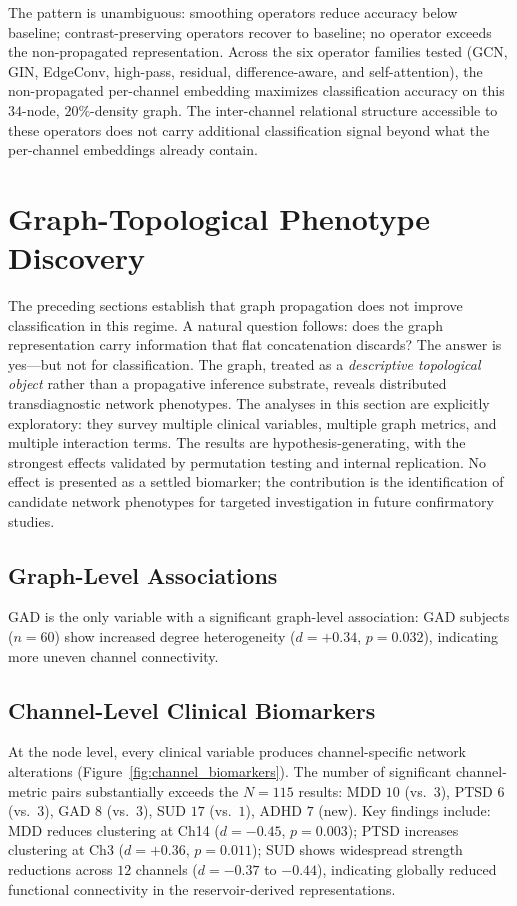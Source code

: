 The pattern is unambiguous: smoothing operators reduce accuracy below baseline; contrast-preserving operators recover to baseline; no operator exceeds the non-propagated representation. Across the six operator families tested (GCN, GIN, EdgeConv, high-pass, residual, difference-aware, and self-attention), the non-propagated per-channel embedding maximizes classification accuracy on this $34$-node, $20\%$-density graph. The inter-channel relational structure accessible to these operators does not carry additional classification signal beyond what the per-channel embeddings already contain.


\section{Graph-Topological Phenotype Discovery}
\label{sec:ch5_interpretability}

The preceding sections establish that graph propagation does not improve classification in this regime. A natural question follows: does the graph representation carry information that flat concatenation discards? The answer is yes---but not for classification. The graph, treated as a \emph{descriptive topological object} rather than a propagative inference substrate, reveals distributed transdiagnostic network phenotypes. The analyses in this section are explicitly exploratory: they survey multiple clinical variables, multiple graph metrics, and multiple interaction terms. The results are hypothesis-generating, with the strongest effects validated by permutation testing and internal replication. No effect is presented as a settled biomarker; the contribution is the identification of candidate network phenotypes for targeted investigation in future confirmatory studies.

\subsection{Graph-Level Associations}

GAD is the only variable with a significant graph-level association: GAD subjects ($n = 60$) show increased degree heterogeneity ($d = +0.34$, $p = 0.032$), indicating more uneven channel connectivity.

\subsection{Channel-Level Clinical Biomarkers}

At the node level, every clinical variable produces channel-specific network alterations (Figure~\ref{fig:channel_biomarkers}). The number of significant channel-metric pairs substantially exceeds the $N = 115$ results: MDD $10$ (vs.\ $3$), PTSD $6$ (vs.\ $3$), GAD $8$ (vs.\ $3$), SUD $17$ (vs.\ $1$), ADHD $7$ (new). Key findings include: MDD reduces clustering at Ch14 ($d = -0.45$, $p = 0.003$); PTSD increases clustering at Ch3 ($d = +0.36$, $p = 0.011$); SUD shows widespread strength reductions across $12$ channels ($d = -0.37$ to $-0.44$), indicating globally reduced functional connectivity in the reservoir-derived representations.

